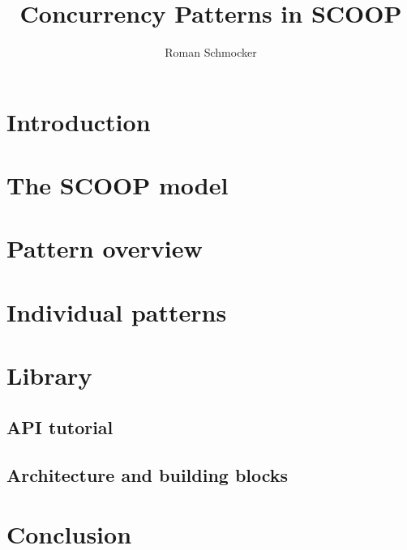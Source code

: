 \documentclass[a4paper,10pt]{report}
\title{Concurrency Patterns in SCOOP}
\author{Roman Schmocker}
\begin{document}
\maketitle

\begin{abstract}
\end{abstract}

\section{Introduction}

\section {The SCOOP model}

\section {Pattern overview}

\section {Individual patterns}

\section {Library}

\subsection {API tutorial}

\subsection {Architecture and building blocks}

\section{Conclusion}
\end{document}
